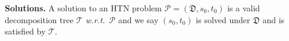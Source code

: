 \documentclass[letterpaper]{article} %
\newcommand{\HtnDomain}{\mathfrak{D}}
\newcommand{\HtnProblem}{\mathcal{P}}
\newcommand{\Constraint}{\prec}
\newcommand{\tn}{\mathsf{tn}}
\newcommand{\Dtree}{\mathcal{T}}
\newcommand{\aspplus}{\textsf{+}}
\begin{document}


%


\smallskip
\noindent\textbf{Solutions.}
A solution to an HTN problem $\HtnProblem = (\HtnDomain,s_0,t_0)$ is a valid decomposition tree $\Dtree$ \emph{w.r.t.}\ $\HtnProblem$ and
we say $(s_0,t_0)$ is solved under $\HtnDomain$ and is satisfied by $\Dtree$.
\end{document}
